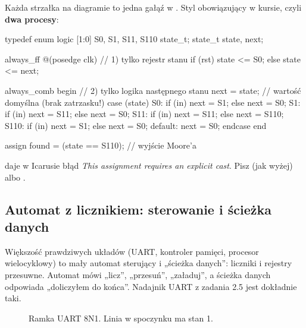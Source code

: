 Każda strzałka na diagramie to jedna gałąź w . Styl obowiązujący w
kursie, czyli \textbf{dwa procesy}:

\begin{sv}
typedef enum logic [1:0] {S0, S1, S11, S110} state_t;
state_t state, next;

always_ff @(posedge clk)              // 1) tylko rejestr stanu
  if (rst) state <= S0;
  else     state <= next;

always_comb begin                     // 2) tylko logika następnego stanu
  next = state;                       //    wartość domyślna (brak zatrzasku!)
  case (state)
    S0:   if (in) next = S1;   else next = S0;
    S1:   if (in) next = S11;  else next = S0;
    S11:  if (in) next = S11;  else next = S110;
    S110: if (in) next = S1;   else next = S0;
    default: next = S0;
  endcase
end

assign found = (state == S110);       // wyjście Moore'a
\end{sv}

\begin{pulapka}
 daje w Icarusie błąd \emph{This assignment requires
an explicit cast}. Pisz  (jak wyżej) albo
.
\end{pulapka}

\subsection*{Automat z licznikiem: sterowanie i ścieżka danych}

Większość prawdziwych układów (UART, kontroler pamięci, procesor wielocyklowy)
to mały automat sterujący i „ścieżka danych”: liczniki i rejestry przesuwne.
Automat mówi „licz”, „przesuń”, „załaduj”, a ścieżka danych odpowiada
„doliczyłem do końca”. Nadajnik UART z zadania 2.5 jest dokładnie taki.

\begin{figure}[h]
\centering
{}
\caption{Ramka UART 8N1. Linia w spoczynku ma stan 1.}
\label{fig:uart}
\end{figure}

